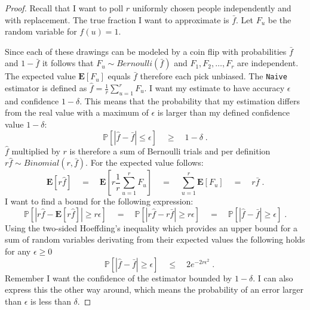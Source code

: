 \begin{proof}
Recall that I want to poll $r$ uniformly chosen people independently and with replacement. The true fraction I want to approximate is $\bar{f}$. Let $F_u$ be the random variable for $f(u) = 1$.

Since each of these drawings can be modeled by a coin flip with probabilities $\bar{f}$ and $1-\bar{f}$ it follows that $F_u \sim  Bernoulli(\bar{f})$ and $F_1, F_2, \ldots , F_r$ are independent. The expected value $\textbf{E}[F_u]$ equals $\bar{f}$ therefore each pick unbiased.
The \texttt{Naive} estimator is defined as $\hat{f} = \frac{1}{r}\sum_{u=1}^{r} F_u$.
I want my estimate to have accuracy $\epsilon$ and confidence $1-\delta$. This means that the probability that my estimation differs from the real value with a maximum of $\epsilon$ is larger than my defined confidence value $1-\delta$:
$$\mathds{P}[|\hat{f}-\bar{f} | \leq \epsilon] \quad\geq\quad 1-\delta \;.$$
$\hat{f}$ multiplied by $r$ is therefore a sum of Bernoulli trials and per definition $r\hat{f} \sim Binomial(r,\bar{f})$. For the expected value follows:
$$\textbf{E}[r\hat{f}] \quad=\quad \textbf{E}[r\frac{1}{r}\sum_{u=1}^{r} F_u] \quad=\quad \sum_{u=1}^{r}\textbf{E}[F_u] \quad=\quad r\bar{f}\;.$$
I want to find a bound for the following expression:
$$\mathds{P}[|r\hat{f}-\textbf{E}[r\hat{f}]| \geq r\epsilon] \quad=\quad \mathds{P}[|r\hat{f}-r\bar{f}| \geq r\epsilon] \quad=\quad \mathds{P}[|\hat{f}-\bar{f}| \geq \epsilon]\;.$$ 
Using the two-sided Hoeffding's inequality which provides an upper bound for a sum of random variables derivating from their expected values the following holds for any $\epsilon \geq 0$
$$\quad \mathds{P}[|\hat{f}-\bar{f}|\geq \epsilon] \quad\leq\quad 2e^{-2r\epsilon^2}\;.$$
Remember I want the confidence of the estimator bounded by $1-\delta$. I can also express this the other way around, which means the probability of an error larger than $\epsilon$ is less than $\delta$.

\end{proof}
